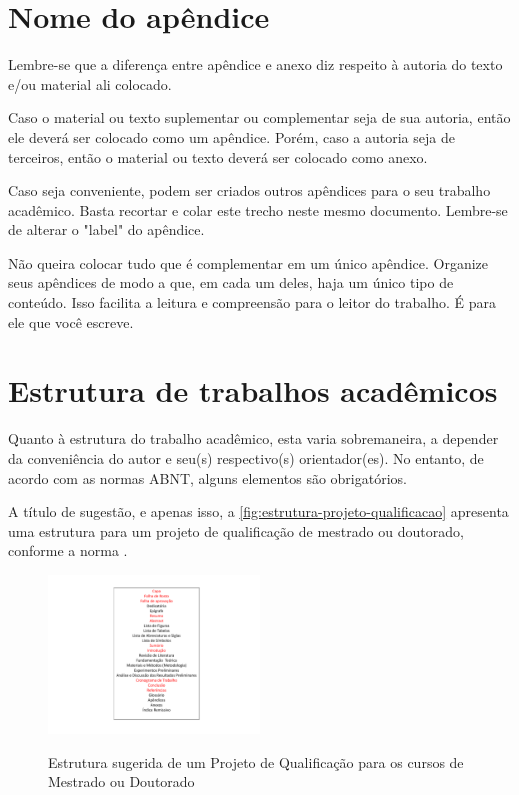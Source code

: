 
%

\begin{apendicesenv}
\partapendices


\chapter{Nome do apêndice}
\label{chap:apendiceA}

Lembre-se que a diferença entre apêndice e anexo diz respeito à autoria do texto
e/ou material ali colocado.

Caso o material ou texto suplementar ou complementar seja de sua autoria, então
ele deverá ser colocado como um apêndice. Porém, caso a autoria seja de
terceiros, então o material ou texto deverá ser colocado como anexo.

Caso seja conveniente, podem ser criados outros apêndices para o seu trabalho
acadêmico. Basta recortar e colar este trecho neste mesmo documento. Lembre-se
de alterar o "label"{} do apêndice.

Não queira colocar tudo que é complementar em um único apêndice. Organize seus
apêndices de modo a que, em cada um deles, haja um único tipo de conteúdo. Isso
facilita a leitura e compreensão para o leitor do trabalho. É para ele que você
escreve.


\chapter{Estrutura de trabalhos acadêmicos}
\label{chap:apEstrTrabAcad}

Quanto à estrutura do trabalho acadêmico, esta varia sobremaneira, a depender da
conveniência do autor e seu(s) respectivo(s) orientador(es). No entanto, de
acordo com as normas ABNT, alguns elementos são obrigatórios.

A título de sugestão, e apenas isso, a \autoref{fig:estrutura-projeto-qualificacao}
apresenta uma estrutura para um projeto de qualificação de mestrado ou
doutorado, conforme a norma .

\begin{figure}[!htb]
    \centering
    \caption{Estrutura sugerida de um Projeto de Qualificação para os cursos de Mestrado ou Doutorado}
    \includegraphics[width=0.5\textwidth]{./4....figures/estrutura-projeto-qualificacao}
    \label{fig:estrutura-projeto-qualificacao}
\end{figure}


\end{apendicesenv}
